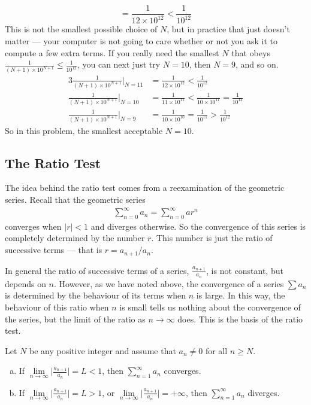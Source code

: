 \begin{eg}
\begin{equation*}
   = \frac{1}{12\times 10^{12}}
   < \frac{1}{10^{12}}
\end{equation*}
This is not the smallest possible choice of $N$, but in practice that
just doesn't matter --- your computer is not going to care whether or not you
ask it to compute a few extra terms. If you really need the smallest $N$
that obeys  $\frac{1}{(N+1)\times 10^{N+1}} \le \frac{1}{10^{12}}$,
you can next just try $N=10$, then $N=9$, and so on.
\begin{alignat*}{3}
\frac{1}{(N+1)\times 10^{N+1}}\bigg|_{N=11}
   &= \frac{1}{12\times 10^{12}}
   < \frac{1}{10^{12}} \\
\frac{1}{(N+1)\times 10^{N+1}}\bigg|_{N=10}
   &= \frac{1}{11\times 10^{11}}
   < \frac{1}{10\times 10^{11}} = \frac{1}{10^{12}} \\
\frac{1}{(N+1)\times 10^{N+1}}\bigg|_{N=9}
   &= \frac{1}{10\times 10^{10}}
   = \frac{1}{10^{11}}
   > \frac{1}{10^{12}}
\end{alignat*}
So in this problem, the smallest acceptable $N=10$.

\end{eg}


\subsection{The Ratio Test}\label{sec:RatioTest}
The idea behind the ratio test comes from a reexamination of the
geometric series. Recall that the geometric series
\begin{align*}
  \sum_{n=0}^\infty a_n = \sum_{n=0}^\infty a r^n
\end{align*}
converges when $|r|<1$ and diverges otherwise. So the convergence of
this series is completely determined by the number $r$. This number
is just the ratio of successive terms --- that is $r = a_{n+1}/a_n$.

In general the ratio of successive terms of a series,
$\frac{a_{n+1}}{a_n}$, is not constant, but depends on
$n$. However, as we have noted above, the convergence of a
series $\sum a_n$ is determined by the behaviour of its
terms when $n$ is large. In this way, the behaviour of this
ratio when $n$ is small tells us nothing about the
convergence of the series, but the limit of the ratio as $n\to\infty$
does. This is the basis of the ratio test.

\begin{theorem}\label{thm:SRratio}
Let $N$ be any positive integer and assume that $a_n\ne 0$ for all $n\ge N$.
\begin{enumerate}[(a)]
\item If $\lim\limits_{n\rightarrow\infty}\Big|\frac{a_{n+1}}{a_n}\Big| = L<1$,
then $\sum\limits_{n=1}^\infty a_n$ converges.
\item If $\lim\limits_{n\rightarrow\infty}\Big|\frac{a_{n+1}}{a_n}\Big| = L>1$,
or $\lim\limits_{n\rightarrow\infty}\Big|\frac{a_{n+1}}{a_n}\Big| = +\infty$,
then $\sum\limits_{n=1}^\infty a_n$ diverges.
\end{enumerate}
\end{theorem}

